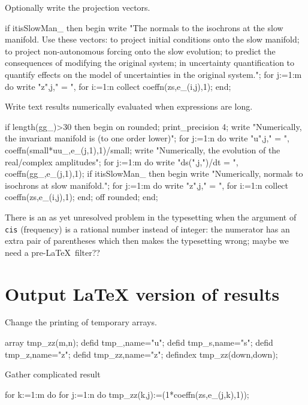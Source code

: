 \documentclass[11pt,a5paper]{article}
\begin{document}
Optionally write the projection vectors.
\begin{reduce}
if itisSlowMan_ then begin
  write "The normals to the isochrons at the slow manifold.
Use these vectors: to project initial conditions
onto the slow manifold; to project non-autonomous
forcing onto the slow evolution; to predict the
consequences of modifying the original system; in
uncertainty quantification to quantify effects on
the model of uncertainties in the original system.";
  for j:=1:m do write "z",j," = ",
    for i:=1:n collect coeffn(zs,e_(i,j),1);
end;
\end{reduce}

Write text results numerically evaluated when expressions are long.
\begin{reduce}
if length(gg_)>30 then begin
on rounded; print_precision 4;
write "Numerically, the invariant manifold is (to one order lower)";
for j:=1:n do write "u",j," = ",
  coeffn(small*uu_,e_(j,1),1)/small;
write "Numerically, the evolution of the real/complex amplitudes";
for j:=1:m do write "ds(",j,")/dt = ",
  coeffn(gg_,e_(j,1),1);
if itisSlowMan_ then begin
  write "Numerically, normals to isochrons at slow manifold.";
  for j:=1:m do write "z",j," = ",
    for i:=1:n collect coeffn(zs,e_(i,j),1);
end;
off rounded;
end;
\end{reduce}


There is an as yet unresolved problem in the typesetting when the argument of \verb|cis| (frequency) is a rational number instead of integer:
the numerator has an extra pair of parentheses which then makes the typesetting wrong;
maybe we need a pre-\LaTeX\ filter??


%

\section{Output LaTeX version of results}
Change the printing of temporary arrays.
\begin{reduce}
array tmp_zz(m,n);
defid tmp_,name="u";
defid tmp_s,name="\dot s";
defid tmp_z,name="\vec z";
defid tmp_zz,name="z";
defindex tmp_zz(down,down);
\end{reduce}

Gather complicated result
\begin{reduce}
for k:=1:m do for j:=1:n do tmp_zz(k,j):=(1*coeffn(zs,e_(j,k),1));
\end{reduce}
\end{document}
